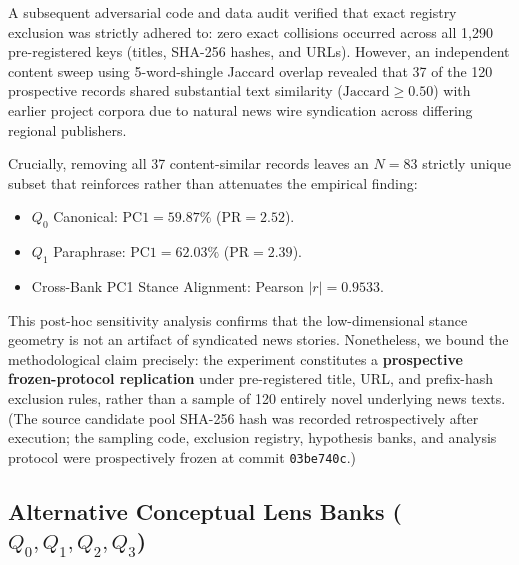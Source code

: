 A subsequent adversarial code and data audit verified that exact registry exclusion was strictly adhered to: zero exact collisions occurred across all 1,290 pre-registered keys (titles, SHA-256 hashes, and URLs). However, an independent content sweep using 5-word-shingle Jaccard overlap revealed that 37 of the 120 prospective records shared substantial text similarity ($\text{Jaccard} \ge 0.50$) with earlier project corpora due to natural news wire syndication across differing regional publishers. 

Crucially, removing all 37 content-similar records leaves an $N=83$ strictly unique subset that reinforces rather than attenuates the empirical finding:
\begin{itemize}
    \item $Q_0$ Canonical: $\mathrm{PC1} = 59.87\%$ ($\mathrm{PR} = 2.52$).
    \item $Q_1$ Paraphrase: $\mathrm{PC1} = 62.03\%$ ($\mathrm{PR} = 2.39$).
    \item Cross-Bank PC1 Stance Alignment: Pearson $|r| = \mathbf{0.9533}$.
\end{itemize}
This post-hoc sensitivity analysis confirms that the low-dimensional stance geometry is not an artifact of syndicated news stories. Nonetheless, we bound the methodological claim precisely: the experiment constitutes a \textbf{prospective frozen-protocol replication} under pre-registered title, URL, and prefix-hash exclusion rules, rather than a sample of 120 entirely novel underlying news texts. (The source candidate pool SHA-256 hash was recorded retrospectively after execution; the sampling code, exclusion registry, hypothesis banks, and analysis protocol were prospectively frozen at commit \texttt{03be740c}.)

\subsection{Alternative Conceptual Lens Banks ($Q_0, Q_1, Q_2, Q_3$)}
\label{sec:multi_lens_results}

